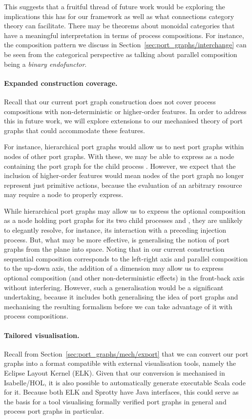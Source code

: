 \documentclass[class=smolathesis,crop=false]{standalone}
\begin{document}
This suggests that a fruitful thread of future work would be exploring the implications this has for our framework as well as what connections category theory can facilitate.
There may be theorems about monoidal categories that have a meaningful interpretation in terms of process compositions.
For instance, the composition pattern we discuss in Section~\ref{sec:port_graphs/interchange} can be seen from the categorical perspective as talking about parallel composition being a \emph{binary endofunctor}.

\paragraph*{Expanded construction coverage.}
Recall that our current port graph construction does not cover process compositions with non-deterministic or higher-order features.
In order to address this in future work, we will explore extensions to our mechanised theory of port graphs that could accommodate these features.

For instance, hierarchical port graphs would allow us to nest port graphs within nodes of other port graphs.
With these, we may be able to express  as a node containing the port graph for the child process .
However, we expect that the inclusion of higher-order features would mean nodes of the port graph no longer represent just primitive actions, because the evaluation of an arbitrary  resource may require a node to properly express.

While hierarchical port graphs may allow us to express the optional composition  as a node holding port graphs for its two child processes  and , they are unlikely to elegantly resolve, for instance, its interaction with a preceding injection process.
But, what may be more effective, is generalising the notion of port graphs from the plane into space.
Noting that in our current construction sequential composition corresponds to the left-right axis and parallel composition to the up-down axis, the addition of a dimension may allow us to express optional composition (and other non-deterministic effects) in the front-back axis without interfering.
However, such a generalisation would be a significant undertaking, because it includes both generalising the idea of port graphs and mechanising the resulting formalism before we can take advantage of it with process compositions.

\paragraph*{Tailored visualisation.}
Recall from Section~\ref{sec:port_graphs/mech/export} that we can convert our port graphs into a format compatible with external visualisation tools, namely the Eclipse Layout Kernel (ELK).
Given that our conversion is mechanised in Isabelle/HOL, it is also possible to automatically generate executable Scala code for it.
Because both ELK and Sprotty have Java interfaces, this could serve as the basis for a tool visualising formally verified port graphs in general and process port graphs in particular.
\end{document}
